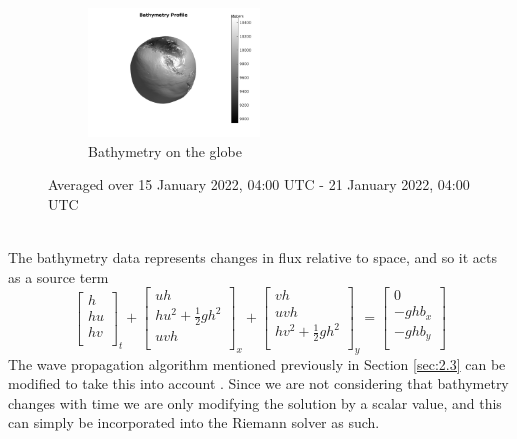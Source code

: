 \documentclass[twoside]{bsu-ms}
\begin{document}
\begin{figure}[!htbp]
\begin{subfigure}{\textwidth}
  \centering
     \centering
     \includegraphics[width=0.5\textwidth,clip=True,trim=0cm 0cm 0cm 0cm]{images/bathprofglobe.png}
     \caption{Bathymetry on the globe}
\end{subfigure}
\caption{Averaged over 15 January 2022, 04:00 $\mathrm{UTC}$ - 21 January 2022, 04:00 $\mathrm{UTC}$}
\label{fig:4.3}
\end{figure}\\
 \indent The bathymetry data represents changes in flux relative to space, and so it acts as a source term
 \begin{equation}\label{eq:4.5}
	\begin{bmatrix}
		h\\
		hu\\
		hv\\
	\end{bmatrix}_{t}+\begin{bmatrix}
	uh\\
	hu^2+\frac{1}{2}gh^2\\
	uvh\\
\end{bmatrix}_{x}+\begin{bmatrix}
vh\\
uvh\\
hv^2+\frac{1}{2}gh^2\\
\end{bmatrix}_y=\begin{bmatrix}
    0\\
    -ghb_{x}\\
    -ghb_{y}\\
\end{bmatrix}
 \end{equation}
 The wave propagation algorithm mentioned previously in Section \ref{sec:2.3} can be modified to take this into account \cite{bale2003wave}. Since we are not considering that bathymetry changes with time we are only modifying the solution by a scalar value, and this can simply be incorporated into the Riemann solver as such.
 
\end{document}
